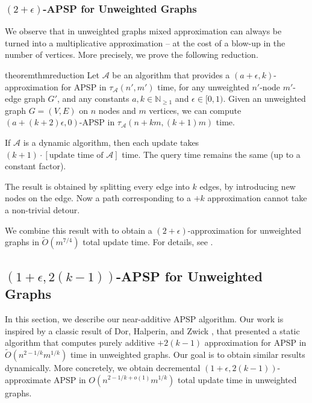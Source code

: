 \subsubsection{\texorpdfstring{$(2+\epsilon)$}{(2+epsilon)}-APSP for Unweighted Graphs} 
We observe that in unweighted graphs mixed approximation can always be turned into a multiplicative approximation -- at the cost of a blow-up in the number of vertices. More precisely, we prove the following reduction. 
\begin{restatable}{theorem}{thmreduction}\label{thm:reduction}
   Let $\mathcal A$ be an algorithm that provides a $(a+\epsilon,k)$-approximation for APSP in $\tau_{\mathcal A}(n',m')$ time, for any unweighted $n'$-node $m'$-edge graph $G'$, and any constants  $a,k\in \mathbb N_{\geq 1}$ and $\epsilon\in[0,1)$. Given an unweighted graph $G=(V,E)$ on $n$ nodes and $m$ vertices, we can compute $(a+(k+2)\epsilon,0)$-APSP in $\tau_{\mathcal A}(n+km,(k+1)m)$ time. 

    If $\mathcal A$ is a dynamic algorithm, then each update takes $(k+1)\cdot [\text{update time of }\mathcal A]$ time. The query time remains the same (up to a constant factor). 
\end{restatable}
The result is obtained by splitting every edge into $k$ edges, by introducing new nodes on the edge. Now a path corresponding to a $+k$ approximation cannot take a non-trivial detour. 

We combine this result with  to obtain a $(2+\epsilon)$-approximation for unweighted graphs in $\tilde O(m^{7/4})$ total update time. For details, see .




\subsection{\texorpdfstring{$(1+\epsilon, 2(k-1))$}{(1+epsilon,2(k-1))}-APSP for Unweighted Graphs} \label{sec:add_overview}


In this section, we describe our near-additive APSP algorithm.
Our work is inspired by a classic result of Dor, Halperin, and Zwick \cite{DHZ00}, that presented a static algorithm that computes purely additive $+2(k-1)$ approximation for APSP in $\tilde{O}(n^{2-1/k}m^{1/k})$ time in unweighted graphs. Our goal is to obtain similar results dynamically. 
More concretely, we obtain decremental $(1+\epsilon,2(k-1))$-approximate APSP in $O(n^{2-1/k+o(1)}m^{1/k})$ total update time in unweighted graphs.

